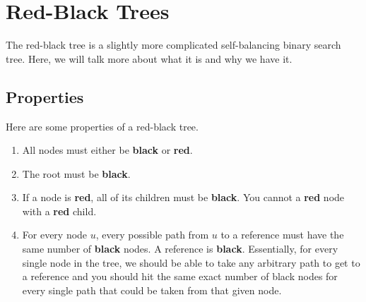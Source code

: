 \documentclass[letterpaper]{article}
\begin{document}
\section{Red-Black Trees}
The red-black tree is a slightly more complicated self-balancing binary search tree. Here, we will talk more about what it is and why we have it. 

\subsection{Properties}
Here are some properties of a red-black tree. 
\begin{enumerate}[(1)]
    \item All nodes must either be \textbf{black} or \textbf{red}. 
    \item The root must be \textbf{black}. 
    \item If a node is \textbf{red}, all of its children must be \textbf{black}. You cannot a \textbf{red} node with a \textbf{red} child. 
    \item For every node $u$, every possible path from $u$ to a  reference must have the same number of \textbf{black} nodes. A  reference is \textbf{black}. Essentially, for every single node in the tree, we should be able to take any arbitrary path to get to a  reference and you should hit the same exact number of black nodes for every single path that could be taken from that given node.
\end{enumerate}
\end{document}
